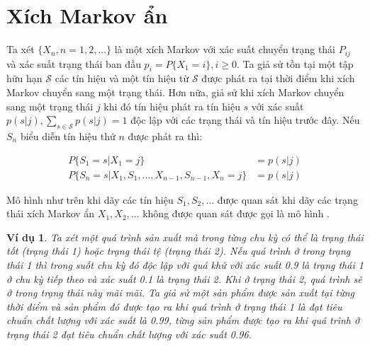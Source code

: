 \documentclass[14pt, a4paper]{article}
\numberwithin{equation}{section}
\numberwithin{figure}{section}
\theoremstyle{sltheorem}
\newtheorem{vd}{Ví dụ}
\theoremstyle{soltheorem}
\numberwithin{dl}{section}
\numberwithin{md}{section}
\numberwithin{vd}{section}
\begin{document}
    \section{Xích Markov ẩn}

    Ta xét $\lbrace X_n, n = 1, 2, \dots \rbrace$ là một xích Markov với xác suất chuyển trạng thái $P_{ij}$ và xác suất trạng thái ban đầu $p_i = P \lbrace X_1 = i \rbrace, i \geq 0$.
    Ta giả sử tồn tại một tập hữu hạn $\mathscr{S}$ các tín hiệu và một tín hiệu từ $\mathscr{S}$ được phát ra tại thời điểm khi xích Markov chuyển sang một trạng thái.
    Hơn nữa, giả sử khi xích Markov chuyển sang một trạng thái $j$ khi đó tín hiệu phát ra tín hiệu $s$ với xác suất $p(s \vert j), \sum_{s \in \mathscr{S}} p(s \vert j) = 1$ độc lập với các trạng thái và tín hiệu trước đây.
    Nếu $S_n$ biểu diễn tín hiệu thứ $n$ được phát ra thì:

    \begin{equation*}
        \begin{aligned}
            P \lbrace S_1 = s \vert X_1 = j \rbrace &= p(s \vert j) \\
            P \lbrace S_n = s \vert X_1, S_1, \dots, X_{n-1}, S_{n-1}, X_n = j \rbrace &= p(s \vert j)
        \end{aligned}
    \end{equation*}

    Mô hình như trên khi dãy các tín hiệu $S_1, S_2, \dots$ được quan sát khi dãy các trạng thái xích Markov ẩn $X_1, X_2, \dots$ không được quan sát được gọi là mô hình .

    \begin{vd} \label{vd:4.42}
        Ta xét một quá trình sản xuất mà trong từng chu kỳ có thể là trạng thái tốt (trạng thái 1) hoặc trạng thái tệ (trạng thái 2).
        Nếu quá trình ở trong trạng thái 1 thì trong suốt chu kỳ đó độc lập với quá khứ với xác suất 0.9 là trạng thái 1 ở chu kỳ tiếp theo và xác suất 0.1 là trạng thái 2.
        Khi ở trạng thái 2, quá trình sẽ ở trong trạng thái này mãi mãi.
        Ta giả sử một sản phẩm được sản xuất tại từng thời điểm và sản phẩm đó được tạo ra khi quá trình ở trạng thái 1 là đạt tiêu chuẩn chất lượng với xác suất là 0.99, từng sản phẩm được tạo ra khi quá trình ở trạng thái 2 đạt tiêu chuẩn chất lượng với xác suất 0.96.    
    \end{vd}
\end{document}
